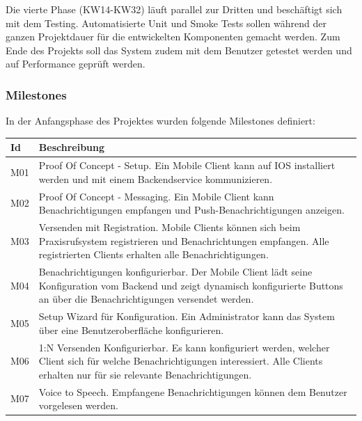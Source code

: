 Die vierte Phase (KW14-KW32) läuft parallel zur Dritten und beschäftigt sich mit dem Testing.
Automatisierte Unit und Smoke Tests sollen während der ganzen Projektdauer für die entwickelten Komponenten gemacht werden.
Zum Ende des Projekts soll das System zudem mit dem Benutzer getestet werden und auf Performance geprüft werden.

\clearpage
\subsubsection*{Milestones}

In der Anfangsphase des Projektes wurden folgende Milestones definiert:

\begin{table}[h]
    \centering
    \begin{tabular}{|l|p{15cm}|}
        \hline
        \textbf{Id} & \textbf{Beschreibung}                                                                                                                                                                                         \\
        \hline
        M01         & Proof Of Concept - Setup. Ein Mobile Client kann auf IOS installiert werden und mit einem Backendservice kommunizieren. \\
        \hline
        M02         & Proof Of Concept - Messaging. Ein Mobile Client kann Benachrichtigungen empfangen und Push-Benachrichtigungen anzeigen. \\
        \hline
        M03         & Versenden mit Registration. Mobile Clients können sich beim Praxisrufsystem registrieren und Benachrichtungen empfangen. Alle registrierten Clients erhalten alle Benachrichtigungen. \\
        \hline
        M04         & Benachrichtigungen konfigurierbar. Der Mobile Client lädt seine Konfiguration vom Backend und zeigt dynamisch konfigurierte Buttons an über die Benachrichtigungen versendet werden.\\
        \hline
        M05         & Setup Wizard für Konfiguration. Ein Administrator kann das System über eine Benutzeroberfläche konfigurieren.  \\
        \hline
        M06         & 1:N Versenden Konfigurierbar. Es kann konfiguriert werden, welcher Client sich für welche Benachrichtigungen interessiert. Alle Clients erhalten nur für sie relevante Benachrichtigungen.  \\
        \hline
        M07         & Voice to Speech. Empfangene Benachrichtigungen können dem Benutzer vorgelesen werden. \\

\end{tabular}
\end{table}
